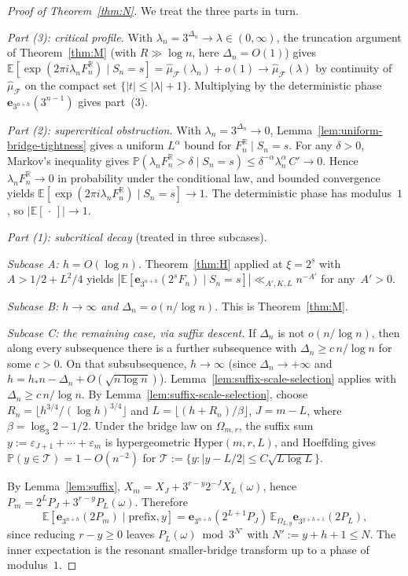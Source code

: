 \documentclass[11pt,a4paper]{amsart}
\theoremstyle{plain}
\theoremstyle{definition}
\newcommand{\R}{\mathbb{R}}
\newcommand{\E}{\mathbb{E}}
\newcommand{\PP}{\mathbb{P}}
\newcommand{\Hyper}{\mathrm{Hyper}}
\begin{document}
\begin{proof}[Proof of Theorem~\ref{thm:N}]
We treat the three parts in turn.

\emph{Part (3): critical profile.}
With $\lambda_n=3^{\Delta_n}\to\lambda\in(0,\infty)$, the truncation
argument of Theorem~\ref{thm:M} (with $R\gg\log n$, here $\Delta_n=O(1)$)
gives
$\E[\exp(2\pi i\lambda_n F_n^{\R})\mid S_n=s]
=\widehat\mu_{\mathcal F}(\lambda_n)+o(1)
\to\widehat\mu_{\mathcal F}(\lambda)$
by continuity of $\widehat\mu_{\mathcal F}$ on the compact set
$\{|t|\le|\lambda|+1\}$.
Multiplying by the deterministic phase $\mathbf e_{3^{n+h}}(3^{n-1})$
gives part~(3).

\emph{Part (2): supercritical obstruction.}
With $\lambda_n=3^{\Delta_n}\to 0$, Lemma~\ref{lem:uniform-bridge-tightness}
gives a uniform $L^\alpha$ bound for $F_n^{\R}\mid S_n=s$.
For any $\delta>0$, Markov's inequality gives
$\PP(\lambda_n F_n^{\R}>\delta\mid S_n=s)\le\delta^{-\alpha}\lambda_n^\alpha\,C'\to 0$.
Hence $\lambda_n F_n^{\R}\to 0$ in probability under the conditional law,
and bounded convergence yields
$\E[\exp(2\pi i\lambda_n F_n^{\R})\mid S_n=s]\to 1$.
The deterministic phase has modulus~$1$, so $|\E[\,\cdot\,]|\to 1$.

\emph{Part (1): subcritical decay} (treated in three subcases).

\emph{Subcase A: $h=O(\log n)$.}
Theorem~\ref{thm:H} applied at $\xi=2^s$ with $A>1/2+L^2/4$ yields
$|\E[\mathbf e_{3^{n+h}}(2^s F_n)\mid S_n=s]|\ll_{A',K,L}n^{-A'}$ for any~$A'>0$.

\emph{Subcase B: $h\to\infty$ and $\Delta_n=o(n/\log n)$.}
This is Theorem~\ref{thm:M}.

\emph{Subcase C: the remaining case, via suffix descent.}
If $\Delta_n$ is not $o(n/\log n)$, then along every subsequence there is a
further subsequence with $\Delta_n\ge c\,n/\log n$ for some $c>0$.
On that subsubsequence, $h\to\infty$ (since $\Delta_n\to+\infty$ and
$h=h_\ast n-\Delta_n+O(\sqrt{n\log n})$).
Lemma~\ref{lem:suffix-scale-selection} applies with $\Delta_n\ge c\,n/\log n$.
By Lemma~\ref{lem:suffix-scale-selection}, choose
$R_n=\lfloor h^{3/4}/(\log h)^{3/4}\rfloor$ and $L=\lfloor(h+R_n)/\beta\rfloor$,
$J=m-L$, where $\beta=\log_3 2-1/2$.
Under the bridge law on $\Omega_{m,r}$, the suffix sum
$y:=\varepsilon_{J+1}+\cdots+\varepsilon_m$ is hypergeometric $\Hyper(m,r,L)$,
and Hoeffding gives
$\PP(y\in\mathcal T)=1-O(n^{-2})$ for
$\mathcal T:=\{y:|y-L/2|\le C\sqrt{L\log L}\}$.

By Lemma~\ref{lem:suffix},
$X_m=X_J+3^{r-y}2^{-J}X_L(\omega)$, hence
$P_m=2^L P_J+3^{r-y}P_L(\omega)$.
Therefore
$$
\E[\mathbf e_{3^{n+h}}(2P_m)\mid\text{prefix},y]
=\mathbf e_{3^{n+h}}(2^{L+1}P_J)\,\E_{\Omega_{L,y}}\mathbf e_{3^{y+h+1}}(2P_L),
$$
since reducing $r-y\ge 0$ leaves $P_L(\omega)\bmod 3^{N'}$ with
$N':=y+h+1\le N$.
The inner expectation is the resonant smaller-bridge transform up to a
phase of modulus~$1$.


\end{proof}
\end{document}
